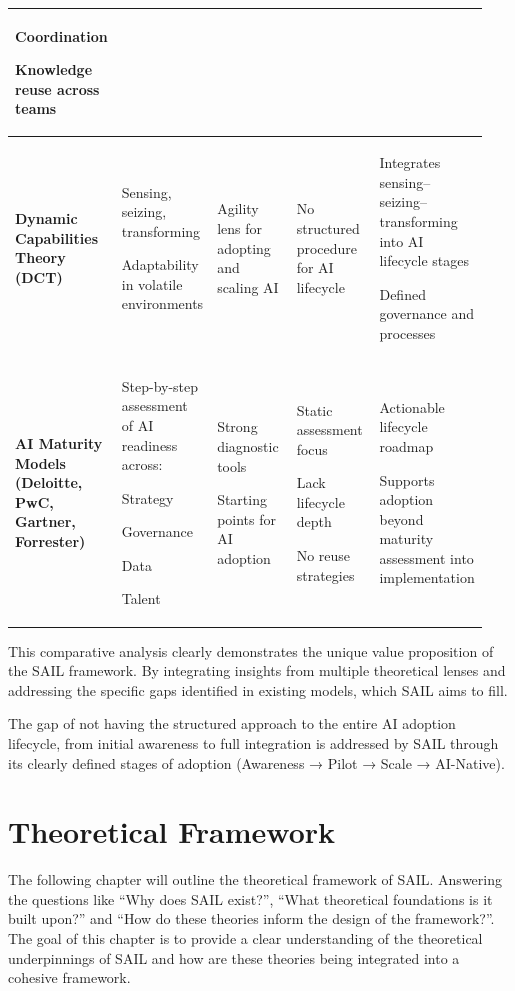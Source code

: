 \documentclass[]{imc-inf}
\begin{document}
\begin{footnotesize}
\begin{longtable}{|p{0.15\linewidth}|p{0.19\linewidth}|p{0.19\linewidth}|p{0.19\linewidth}|p{0.22\linewidth}|}
Coordination

Knowledge reuse across teams \\
\hline

\textbf{Dynamic Capabilities Theory (DCT)} &
Sensing, seizing, transforming

Adaptability in volatile environments &
Agility lens for adopting and scaling AI &
No structured procedure for AI lifecycle &
Integrates sensing--seizing--transforming into AI lifecycle stages

Defined governance and processes \\
\hline

\textbf{AI Maturity Models (Deloitte, PwC, Gartner, Forrester)} &
Step-by-step assessment of AI readiness across:

Strategy

Governance

Data

Talent &
Strong diagnostic tools

Starting points for AI adoption &
Static assessment focus

Lack lifecycle depth

No reuse strategies &
Actionable lifecycle roadmap

Supports adoption beyond maturity assessment into implementation \\
\hline


\end{longtable}
\end{footnotesize}


This comparative analysis clearly demonstrates the unique value
proposition of the SAIL framework. By integrating insights from multiple
theoretical lenses and addressing the specific gaps identified in
existing models, which SAIL aims to fill.

The gap of not having the structured approach to the entire AI adoption
lifecycle, from initial awareness to full integration is addressed by
SAIL through its clearly defined stages of adoption (Awareness → Pilot →
Scale → AI-Native).

\chapter{Theoretical Framework}\label{theoretical-framework}

The following chapter will outline the theoretical framework of SAIL.
Answering the questions like ``Why does SAIL exist?'', ``What
theoretical foundations is it built upon?'' and ``How do these theories
inform the design of the framework?''. The goal of this chapter is to
provide a clear understanding of the theoretical underpinnings of SAIL
and how are these theories being integrated into a cohesive framework.
\end{document}
